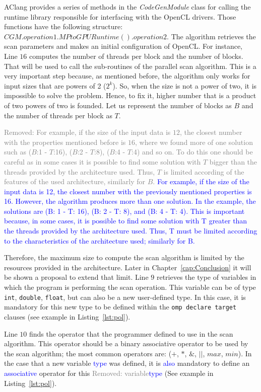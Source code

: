 \documentclass[Ingles]{ic-tese-v1}
\newcommand{\rem}[1]{\noindent\textcolor{gray}{Removed: {#1}}}
\newcommand{\new}[1]{\noindent\textcolor{blue}{ {#1}}}
\newcommand{\rem}[1]{}
\newcommand{\new}[1]{#1}
\newcommand{\rcap}[1]{Chapter~\ref{cap:#1}}
\newcommand{\ttt}[1]{{\texttt{#1}}}
\newcommand{\rlst}[1]{Listing~\ref{lst:#1}}
\begin{document}
AClang provides a series of methods in the {\it CodeGenModule} class for
calling the runtime library responsible for interfacing with the OpenCL
drivers. Those functions have the following structure:
$CGM.operation1.MPtoGPURuntime().operation2$. The algorithm retrieves the scan
parameters and makes an initial configuration of OpenCL. For instance, Line $16$ computes
the number of threads per block and the number of blocks. That will be used to
call the sub-routines of the parallel scan algorithm. This is a very important
step because, as mentioned before, the algorithm only works for input sizes that
are powers of 2 ($2^{k}$). So, when the size is not a power of two, it is
impossible to solve the problem. Hence, to fix it,
higher number that is a product of two powers of two is founded. Let us represent the
number of blocks as $B$ and the number of threads per block as $T$.

\rem{For example, if the size of the input data is $12$, the closest number with the
properties mentioned before is $16$, where we found more of one solution such
as ($B$:1 - $T$:16), ($B$:2 - $T$:8), ($B$:4 - $T$:4) and so on.  To do this one should
be careful as in some cases it is possible to find some solution with $T$ bigger than the threads
provided by the architecture used.  Thus, $T$ is limited according of the  features of the
used architecture, similarly for $B$.}
\new{For example, if the size of the input data is 12, the closest number with
the previously mentioned properties is 16. However, the algorithm produces more
than one solution. In the example, the solutions are (B: 1 - T: 16), (B: 2 - T:
8), and (B: 4 - T: 4). This is important because, in some cases, it is possible
to find some solution with T greater than the threads provided by the
architecture used. Thus, T must be limited according to the characteristics of
the architecture used; similarly for B.}

Therefore, the maximum size to compute the scan algorithm is limited by the
resources provided in the architecture. Later in \rcap{Conclusion} it will be shown
a proposal to extend that limit.  Line $9$ retrieves the type of variables in
which the program is performing the scan operation. This variable can be of
type  \ttt{int},  \ttt{double},  \ttt{float}, but can also be a new user-defined type. In this case,
it is mandatory for this new type to be defined within the \ttt{omp declare target}
clauses (see example in \rlst{pol}).

Line $10$ finds the operator that the programmer defined to use in the scan
algorithm. This operator should be a binary associative operator to be used
by the scan algorithm; the most common operators are: ($+$, $*$, $\&$, $||$,
$max$, $min$). In the case that a new variable \new{type} was defined, it is \new{also} mandatory
to define an \new{associative} operator for this \rem{variable}\new{type} (See example in \rlst{pol}).
\end{document}
